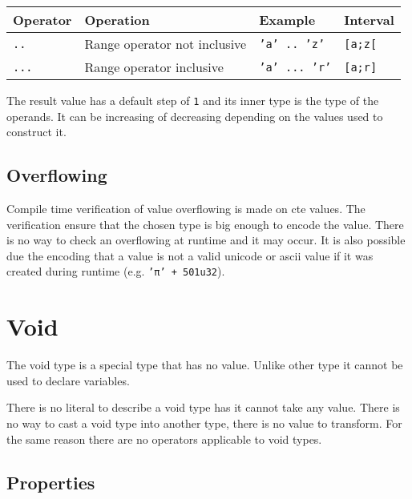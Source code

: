 \begin{itemize}
  \begin{center}
    \vspace{-10pt}\begin{adjustbox}{max width=1.0\linewidth}
      \begin{tabular}{|l|lll|}
        \hline
        Operator & Operation & Example & Interval\\[0pt]
        \hline
        \hline
        \texttt{..} & Range operator not inclusive & \texttt{'a' .. 'z'} & \texttt{[a;z[}\\[0pt]
            \texttt{...} & Range operator inclusive & \texttt{'a' ... 'r'} & \texttt{[a;r]}\\[0pt]
            \hline
      \end{tabular}
  \end{adjustbox}\end{center}


  The result value has a default step of \texttt{1} and its inner type is the type of the operands. It can be increasing of decreasing depending on the values used to construct it.
\end{itemize}

\subsection{Overflowing}
\label{sec:orga9c18c5}

Compile time verification of value overflowing is made on cte values. The
verification ensure that the chosen type is big enough to encode the value.
There is no way to check an overflowing at runtime and it may occur. It is also
possible due the encoding that a value is not a valid unicode or ascii value if
it was created during runtime (e.g. \texttt{'π' + 501u32}).

\section{Void}
\label{sec:org409c2d8}

The void type is a special type that has no value. Unlike other type it cannot
be used to declare variables.

There is no literal to describe a void type has it cannot take any value. There
is no way to cast a void type into another type, there is no value to transform.
For the same reason there are no operators applicable to void types.

\vspace{-10pt}
\subsection{Properties}
\label{sec:orgffa98ee}

